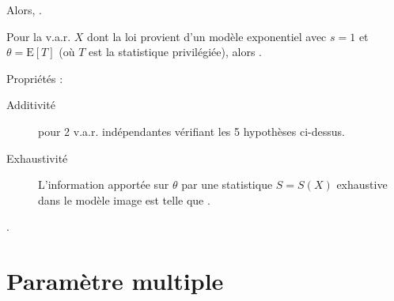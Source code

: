 \documentclass[10pt, french]{report}
\begin{document}
\begin{multicols*}{2}
\begin{definitionNOHFILL}
Alors, .
\end{definitionNOHFILL}

\begin{definitionNOHFILLsub}
Pour la v.a.r. $X$ dont la loi provient d'un modèle exponentiel avec $s = 1$ et $\theta = \text{E}[T]$ (où $T$ est la statistique privilégiée), alors .
\end{definitionNOHFILLsub}

\bigskip

Propriétés : 
\begin{description}
	\item[Additivité]	 pour 2 v.a.r. indépendantes vérifiant les 5 hypothèses ci-dessus.
	\item[Exhaustivité]	L'information apportée sur $\theta$ par une statistique $S = S(X)$ exhaustive dans le modèle image est telle que .
\end{description}

\bigskip

.


\columnbreak
\section{Paramètre multiple}


\end{multicols*}
\end{document}
